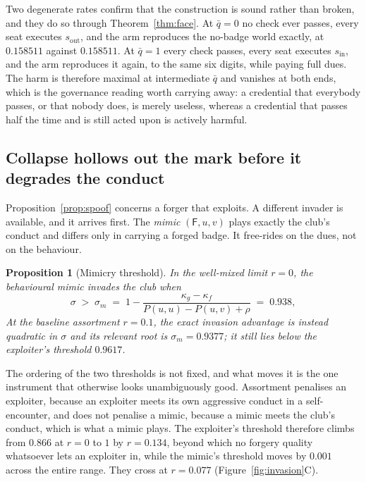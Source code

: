 \documentclass[11pt,a4paper]{article}
\newtheorem{proposition}[theorem]{Proposition}
\theoremstyle{definition}
\begin{document}
Two degenerate rates confirm that the construction is sound rather than broken,
and they do so through Theorem~\ref{thm:face}. At $\bar{q} = 0$ no check ever
passes, every seat executes $s_{\mathrm{out}}$, and the arm reproduces the
no-badge world exactly, at $0.158511$ against $0.158511$. At $\bar{q} = 1$
every check passes, every seat executes $s_{\mathrm{in}}$, and the arm
reproduces it again, to the same six digits, while paying full dues. The harm
is therefore maximal at intermediate $\bar{q}$ and vanishes at both ends, which
is the governance reading worth carrying away: a credential that everybody
passes, or that nobody does, is merely useless, whereas a credential that
passes half the time and is still acted upon is actively harmful.

\subsection{Collapse hollows out the mark before it degrades the conduct}
\label{sec:mimicry}

Proposition~\ref{prop:spoof} concerns a forger that exploits. A different
invader is available, and it arrives first. The \emph{mimic}
$(\mathsf{F}, u, v)$ plays exactly the club's conduct and differs only in
carrying a forged badge. It free-rides on the dues, not on the behaviour.

\begin{proposition}[Mimicry threshold]
\label{prop:mimicry}
In the well-mixed limit $r=0$, the behavioural mimic invades the club when
\begin{equation}
\label{eq:sigmam}
\sigma \;>\; \sigma_m \;=\; 1 - \frac{\kappa_g - \kappa_f}{P(u,u) - P(u,v) + \rho}
  \;=\; 0.938 ,
\end{equation}
At the baseline assortment $r=0.1$, the exact invasion advantage is instead
quadratic in $\sigma$ and its relevant root is $\sigma_m=0.9377$; it still lies
below the exploiter's threshold $0.9617$.
\end{proposition}

The ordering of the two thresholds is not fixed, and what moves it is the one
instrument that otherwise looks unambiguously good. Assortment penalises an
exploiter, because an exploiter meets its own aggressive conduct in a
self-encounter, and does not penalise a mimic, because a mimic meets the club's
conduct, which is what a mimic plays. The exploiter's threshold therefore
climbs from $0.866$ at $r = 0$ to $1$ by $r = 0.134$, beyond which no forgery
quality whatsoever lets an exploiter in, while the mimic's threshold moves by
$0.001$ across the entire range. They cross at $r = 0.077$
(Figure~\ref{fig:invasion}C).
\end{document}
